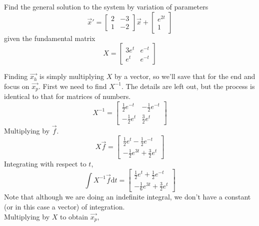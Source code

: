 \begin{example}
	Find the general solution to the system by variation of parameters
	\begin{equation*}
		\vec{x}' = \begin{bmatrix}
			2 & -3 \\
			1 & -2
		\end{bmatrix}\vec{x} + \begin{bmatrix}
			e^{2t} \\
			1
		\end{bmatrix}
	\end{equation*}
	given the fundamental matrix
	\begin{equation*}
		X = \begin{bmatrix}
			3e^t & e^{-t} \\
			e^t & e^{-t}
		\end{bmatrix}
	\end{equation*}
\end{example}
\noindent
Finding $\vec{x_h}$ is simply multiplying $X$ by a vector, so we'll save that for the end and focus on $\vec{x_p}$. First we need to find $X^{-1}$. The details are left out, but the process is identical to that for matrices of numbers.
\begin{equation*}
	X^{-1} = \begin{bmatrix}
		\frac{1}{2}e^{-t} & -\frac{1}{2}e^{-t} \\
		-\frac{1}{2}e^t & \frac{3}{2}e^t
	\end{bmatrix}
\end{equation*}
Multiplying by $\vec{f}$.
\begin{equation*}
	X\vec{f} = \begin{bmatrix}
		\frac{1}{2}e^t - \frac{1}{2}e^{-t} \\
		-\frac{1}{2}e^{3t} + \frac{3}{2}e^t
	\end{bmatrix}
\end{equation*}
Integrating with respect to $t$,
\begin{equation*}
	\int{X^{-1}\vec{f} \mathrm{d}t} = \begin{bmatrix}
		\frac{1}{2}e^t + \frac{1}{2}e^{-t} \\
		-\frac{1}{6}e^{3t} + \frac{3}{2}e^t
	\end{bmatrix}
\end{equation*}
Note that although we are doing an indefinite integral, we don't have a constant (or in this case a vector) of integration.\\
Multiplying by $X$ to obtain $\vec{x_p}$,
